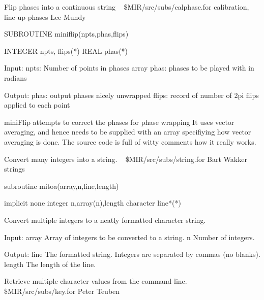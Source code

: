 %
\noindent Flip phases into a continuous string
\newline \ 
\newline {} \$MIR/src/subs/calphase.for
\newline {} calibration, line up phases
\newline {} Lee Mundy
\par{\tenpoint
{\eightpoint\begintt
      SUBROUTINE miniflip(npts,phas,flips)

      INTEGER npts, flips(*)
      REAL    phas(*)

   Input:
       npts:   Number of points in phases array
       phas:   phases to be played with in radians

   Output:
       phas:   output phases nicely unwrapped
       flips:  record of number of 2pi flips applied to each point

   miniFlip attempts to correct the phases for phase wrapping
   It uses vector averaging, and hence needs to be supplied
   with an array specifiying how vector averaging is done.
   The source code is full of witty comments how it really
   works.
\endtt}
\par}
%
\noindent Convert many integers into a string.
\newline \ 
\newline {} \$MIR/src/subs/string.for
\newline {} Bart Wakker
\newline \abox{Keywords:} strings
\par{\tenpoint
{\eightpoint\begintt
        subroutine mitoa(array,n,line,length)

        implicit none
        integer n,array(n),length
        character line*(*)

  Convert multiple integers to a neatly formatted character string.

  Input:
    array      Array of integers to be converted to a string.
    n          Number of integers.

  Output:
    line       The formatted string. Integers are separated by
               commas (no blanks).
    length     The length of the line.
\endtt}
\par}
%
\noindent Retrieve multiple character values from the command line.
\newline \ 
\newline {} \$MIR/src/subs/key.for
\newline \abox{Responsible:} Peter Teuben
